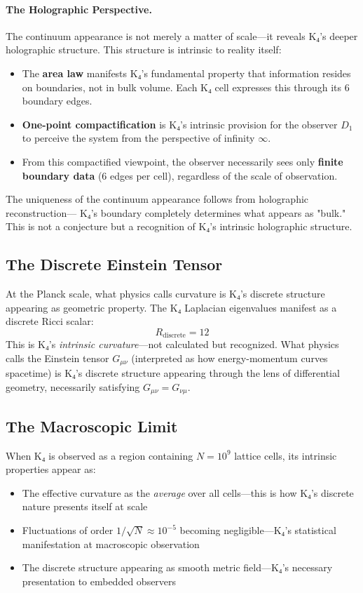 \documentclass[11pt,a4paper]{book}
\begin{document}
\paragraph{The Holographic Perspective.}

The continuum appearance is not merely a matter of scale—it reveals K₄'s deeper holographic structure. 
This structure is intrinsic to reality itself:

\begin{itemize}
\item The \textbf{area law} manifests K₄'s fundamental property that information resides on boundaries, 
not in bulk volume. Each K₄ cell expresses this through its 6 boundary edges.
\item \textbf{One-point compactification} is K₄'s intrinsic provision for the observer 
$D_1$ to perceive the system from the perspective of infinity $\infty$.
\item From this compactified viewpoint, the observer necessarily sees only \textbf{finite boundary data} 
(6 edges per cell), regardless of the scale of observation.
\end{itemize}

The uniqueness of the continuum appearance follows from holographic reconstruction—
K₄'s boundary completely determines what appears as "bulk." This is not a conjecture but 
a recognition of K₄'s intrinsic holographic structure.

\subsection{The Discrete Einstein Tensor}

At the Planck scale, what physics calls curvature is K₄'s discrete structure appearing 
as geometric property. The K₄ Laplacian eigenvalues manifest as a discrete Ricci scalar:
\[
R_{\text{discrete}} = 12
\]
This is K₄'s \emph{intrinsic curvature}—not calculated but recognized. What physics calls 
the Einstein tensor $G_{\mu\nu}$ (interpreted as how energy-momentum curves spacetime) 
is K₄'s discrete structure appearing through the lens of differential geometry, necessarily 
satisfying $G_{\mu\nu} = G_{\nu\mu}$.

\subsection{The Macroscopic Limit}

When K₄ is observed as a region containing $N = 10^9$ lattice cells, its intrinsic properties 
appear as:
\begin{itemize}
\item The effective curvature as the \emph{average} over all cells—this is how K₄'s discrete nature 
presents itself at scale
\item Fluctuations of order $1/\sqrt{N} \approx 10^{-5}$ becoming negligible—K₄'s statistical 
manifestation at macroscopic observation
\item The discrete structure appearing as smooth metric field—K₄'s necessary presentation to 
embedded observers
\end{itemize}
\end{document}
